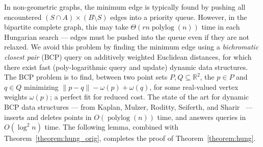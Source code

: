 \documentclass[11pt]{article}
\def\polylog{\mathop{\mathrm{polylog}}}
\theoremstyle{plain}
\begin{document}
In non-geometric graphs, the minimum edge is typically found by pushing all
encountered $(S \cap A) \times (B \setminus S)$ edges into a priority queue.
However, in the bipartite complete graph, this may take $\Theta(rn\polylog(n))$
time in each Hungarian search --- edges must be pushed into the queue even if
they are not relaxed.
We avoid this problem by finding the minimum edge using a \emph{bichromatic
closest pair} (BCP) query on additively weighted Euclidean distances,
for which there exist fast (poly-logarithmic query and update) dynamic data
structures.
The BCP problem is to find, between two point sets
$P, Q \subseteq \mathbb{R}^2$, the $p \in P$ and $q \in Q$ minimizing
$\|p - q\| - \omega(p) + \omega(q)$, for some real-valued vertex weights
$\omega(p)$; a perfect fit for reduced cost.
The state of the art for dynamic BCP data structures --- from Kaplan, Mulzer,
Roditty, Seiferth, and Sharir~\cite{KMRSS17} --- inserts and deletes points in
$O(\polylog(n))$ time, and answers queries in $O(\log^2 n)$ time.
The following lemma, combined with Theorem~\ref{theorem:hung_orig}, completes
the proof of Theorem~\ref{theorem:hung}.
\end{document}
